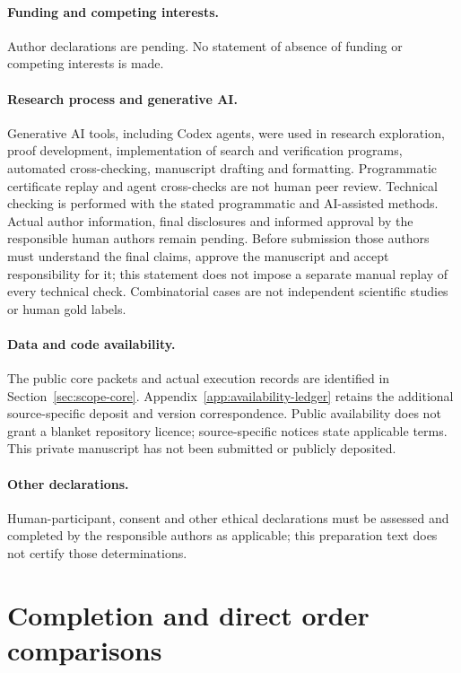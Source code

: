 \documentclass[pdflatex,sn-mathphys-num]{sn-jnl}
\theoremstyle{thmstyleone}
\theoremstyle{thmstylethree}
\theoremstyle{thmstyletwo}
\begin{document}
\paragraph*{Funding and competing interests.}
Author declarations are pending. No statement of absence of funding or competing interests is made.
\paragraph*{Research process and generative AI.}
Generative AI tools, including Codex agents, were used in research exploration, proof development, implementation of search and verification programs, automated cross-checking, manuscript drafting and formatting. Programmatic certificate replay and agent cross-checks are not human peer review. Technical checking is performed with the stated programmatic and AI-assisted methods. Actual author information, final disclosures and informed approval by the responsible human authors remain pending. Before submission those authors must understand the final claims, approve the manuscript and accept responsibility for it; this statement does not impose a separate manual replay of every technical check. Combinatorial cases are not independent scientific studies or human gold labels.
\paragraph*{Data and code availability.}
The public core packets and actual execution records are identified in
Section~\ref{sec:scope-core}. Appendix~\ref{app:availability-ledger}
retains the additional source-specific deposit and version correspondence.
Public availability does not grant a blanket repository licence;
source-specific notices state applicable terms. This private manuscript
has not been submitted or publicly deposited.

\paragraph*{Other declarations.}
Human-participant, consent and other ethical declarations must be assessed and completed by the responsible authors as applicable; this preparation text does not certify those determinations.


\clearpage
\label{page:references-start}

\clearpage
\appendix

\section{Completion and direct order comparisons}\label{app:completion-comparisons}
\end{document}
